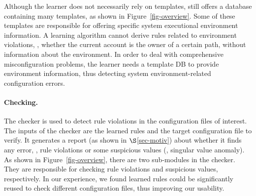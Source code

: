 Although the learner does not necessarily rely on templates,
\app still offers a database containing many templates,
as shown in Figure~\ref{fig-overview}.
Some of these templates are responsible for offering
specific system executional environment information.
A learning algorithm cannot derive rules 
related to environment violations, \eg,
whether the current account is 
the owner of a certain path, without information 
about the environment. 
In order to deal with comprehensive misconfiguration problems,
the learner needs a template DB to provide environment information,
thus detecting system environment-related configuration errors.

\paragraph{Checking.}
The checker is used to detect rule violations in the configuration
files of interest. The inputs of the checker are the learned rules 
and the target configuration file to verify.
It generates a report (as shown in $\S$\ref{sec-motiv}) about 
whether it finds any error, \eg, rule violations 
or some suspicious values (\eg, singular value anomaly).
As shown in Figure~\ref{fig-overview},
there are two sub-modules in the checker. They are responsible for
checking rule violations and suspicious values, respectively.
In our experience, we found learned rules could be significantly reused
to check different configuration files, thus improving our usability.  
